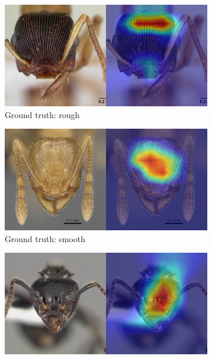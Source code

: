 \documentclass{aci}
\numberwithin{equation}{section}
\begin{document}
\begin{figure}
    \centering
    \begin{subfigure}{\subwidth}
        \includegraphics[width=1\linewidth]{thesis_assets/gradcam/incorrect_ideal/84.png}
        \caption{Ground truth: rough}
        \label{fig:incorrect_ideal_84}
    \end{subfigure}
    \begin{subfigure}{\subwidth}
        \includegraphics[width=1\linewidth]{thesis_assets/gradcam/incorrect_ideal/86.png}
        \caption{Ground truth: smooth}
        \label{fig:incorrect_ideal_86}
    \end{subfigure}
    \begin{subfigure}{\subwidth}
        \includegraphics[width=1\linewidth]{thesis_assets/gradcam/incorrect_ideal/177.png}

\end{subfigure}
\end{figure}
\end{document}
